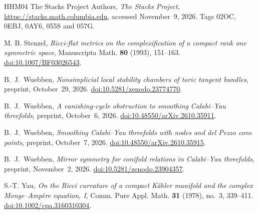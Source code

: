 \begin{thebibliography}{HHM04}
The Stacks Project Authors,
\emph{The Stacks Project},
\url{https://stacks.math.columbia.edu}, accessed November~9, 2026.
Tags 02OC, 0EBJ, 0AY6, 055S and 057G.

M. B. Stenzel,
\emph{Ricci-flat metrics on the complexification of a compact rank one
symmetric space},
Manuscripta Math. \textbf{80} (1993), 151--163.
\href{https://doi.org/10.1007/BF03026543}{doi:10.1007/BF03026543}.

B.~J.~Wuebben,
\emph{Nonsimplicial local stability chambers of toric tangent bundles},
preprint, October~29, 2026.
\href{https://doi.org/10.5281/zenodo.23774770}{doi:10.5281/zenodo.23774770}.

B.~J.~Wuebben,
\emph{A vanishing-cycle obstruction to smoothing Calabi--Yau threefolds},
preprint, October~6, 2026.
\href{https://doi.org/10.48550/arXiv.2610.35911}{doi:10.48550/arXiv.2610.35911}.

B.~J.~Wuebben,
\emph{Smoothing Calabi--Yau threefolds with nodes and del Pezzo cone points},
preprint, October~7, 2026.
\href{https://doi.org/10.48550/arXiv.2610.35915}{doi:10.48550/arXiv.2610.35915}.

B.~J.~Wuebben,
\emph{Mirror symmetry for conifold relations in Calabi--Yau threefolds},
preprint, November~2, 2026.
\href{https://doi.org/10.5281/zenodo.23904357}{doi:10.5281/zenodo.23904357}.

S.-T. Yau,
\emph{On the Ricci curvature of a compact K\"ahler manifold and the complex
Monge--Amp\`ere equation, I},
Comm. Pure Appl. Math. \textbf{31} (1978), no.~3, 339--411.
\href{https://doi.org/10.1002/cpa.3160310304}{doi:10.1002/cpa.3160310304}.

\end{thebibliography}
